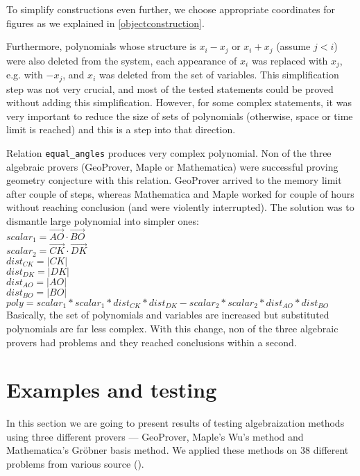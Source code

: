 \documentclass[final,1p,times,authoryear]{elsarticle}
\begin{document}
To simplify constructions even further, we choose appropriate
coordinates for figures as we explained in \ref{objectconstruction}.

Furthermore, polynomials whose structure is $x_i - x_j$ or $x_i + x_j$
(assume $j < i$) were also deleted from the system, each appearance of
$x_i$ was replaced with $x_j$, e.g. with $-x_j$, and $x_i$ was deleted
from the set of variables. This simplification step was not very
crucial, and most of the tested statements could be proved without
adding this simplification. However, for some complex statements, it
was very important to reduce the size of sets of polynomials
(otherwise, space or time limit is reached) and this is a step into
that direction.

Relation {\tt equal\_angles} produces very complex polynomial. Non of
the three algebraic provers (GeoProver, Maple or Mathematica) were
successful proving geometry conjecture with this relation. GeoProver
arrived to the memory limit after couple of steps, whereas Mathematica
and Maple worked for couple of hours without reaching conclusion (and
were violently interrupted). The solution was to dismantle large
polynomial into simpler ones: \\
$scalar_1 = \overrightarrow{AO}\cdot\overrightarrow{BO}$ \\
$scalar_2 = \overrightarrow{CK}\cdot\overrightarrow{DK}$ \\
$dist_{CK} = |CK|$ \\
$dist_{DK} = |DK|$ \\
$dist_{AO} = |AO|$ \\
$dist_{BO} = |BO|$ \\
$poly = scalar_1 * scalar_1 * dist_{CK} * dist_{DK} - scalar_2 * scalar_2 * dist_{AO} * dist_{BO}$ \\

Basically, the set of polynomials and variables are increased but
substituted polynomials are far less complex. With this change, non of
the three algebraic provers had problems and they reached conclusions
within a second.

\section{Examples and testing}

In this section we are going to present results of testing
algebraization methods using three different provers --- GeoProver,
Maple's Wu's method and Mathematica's Gr\"obner basis method. We
applied these methods on 38 different problems from various source
(\cite{janicic1997zbirka, shao2016challenging, arhzbirka, kinknjiga}).
\end{document}
